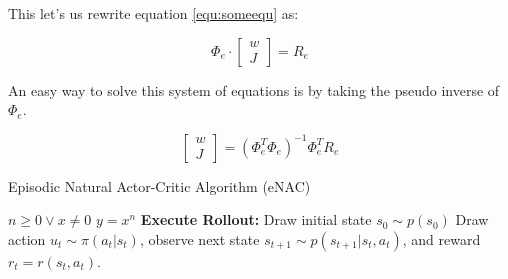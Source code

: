 \noindent This let's us rewrite equation \ref{equ:someequ} as:

\begin{equation}
	\Phi_e \cdot \begin{bmatrix} w\\J \end{bmatrix}  = R_e
\end{equation}

\noindent An easy way to solve this system of equations is by taking the pseudo inverse of $\Phi_e$.

\begin{equation}
	\begin{bmatrix} w\\J \end{bmatrix} = (\Phi_e^T \Phi_e)^{-1} \Phi_e^T R_e
\end{equation}

\begin{algorithm}
	\caption{Episodic Natural Actor-Critic Algorithm (eNAC)}\label{euclid}
	\begin{algorithmic}
		\REQUIRE $n \geq 0 \vee x \neq 0$
		\ENSURE $y = x^n$
				\STATE \textbf{Execute Rollout:} Draw initial state $s_0 \sim p(s_0)$
					\STATE Draw action $u_t\sim\pi(a_t|s_t)$, observe next state $s_{t+1} \sim p(s_{t+1}|s_t, a_t)$, and reward $r_t = r(s_t, a_t)$.
				\ENDFOR
			\ENDFOR
		\ENDFOR
	\end{algorithmic}
\end{algorithm}




